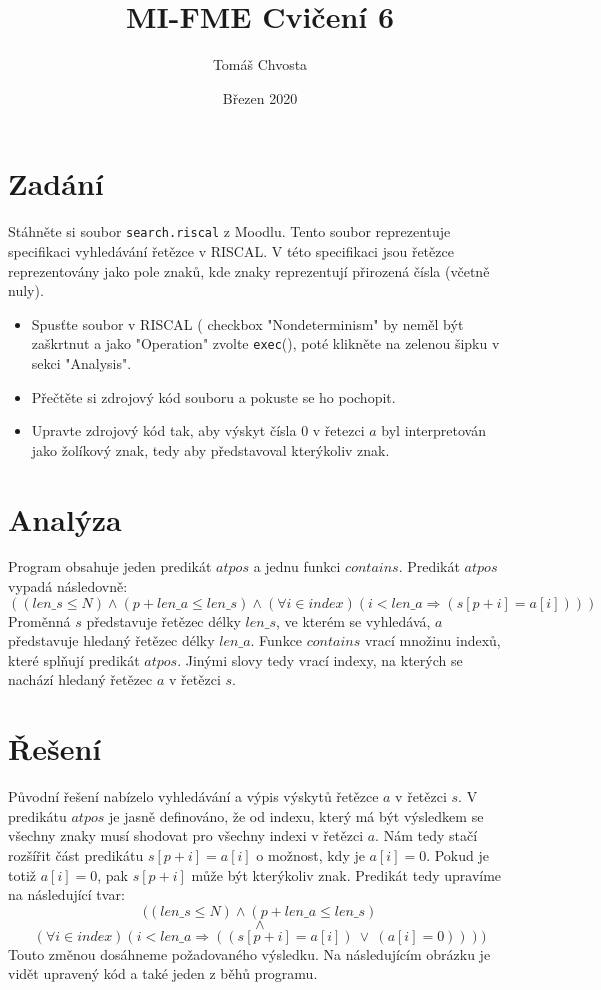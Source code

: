 \documentclass{article}
\title{MI-FME Cvičení 6}
\author{Tomáš Chvosta}
\date{Březen 2020}
\begin{document}
\maketitle

\section{Zadání}

Stáhněte si soubor \texttt{search.riscal} z Moodlu. Tento soubor reprezentuje specifikaci vyhledávání řetězce v RISCAL. V této specifikaci jsou řetězce reprezentovány jako pole znaků, kde znaky reprezentují přirozená čísla (včetně nuly).

\begin{itemize}
				
	\item Spusťte soubor v RISCAL ( checkbox "Nondeterminism" by neměl být zaškrtnut a jako "Operation" zvolte \texttt{exec}(), poté klikněte na zelenou šipku v sekci "Analysis".
	
	\item Přečtěte si zdrojový kód souboru a pokuste se ho pochopit.
	
	\item Upravte zdrojový kód tak, aby výskyt čísla $0$ v řetezci $a$ byl interpretován jako žolíkový znak, tedy aby představoval kterýkoliv znak.
					
\end{itemize}

\section{Analýza}

Program obsahuje jeden predikát $atpos$ a jednu funkci $contains$. Predikát $atpos$ vypadá následovně:
$$((len\_s \leq N) \wedge (p+len\_a \leq len\_s) \wedge (\forall i \in index)(i < len\_a \Rightarrow (s[p+i]=a[i])))$$
Proměnná $s$ představuje řetězec délky $len\_s$, ve kterém se vyhledává, $a$ představuje hledaný řetězec délky $len\_a$. Funkce $contains$ vrací množinu indexů, které splňují predikát $atpos$. Jinými slovy tedy vrací indexy, na kterých se nachází hledaný řetězec $a$ v řetězci $s$.

\section{Řešení}

Původní řešení nabízelo vyhledávání a výpis výskytů řetězce $a$ v řetězci $s$. V predikátu $atpos$ je jasně definováno, že od indexu, který má být výsledkem se všechny znaky musí shodovat pro všechny indexi v řetězci $a$. Nám tedy stačí rozšířit část predikátu $s[p+i]=a[i]$ o možnost, kdy je $a[i] = 0 $. Pokud je totiž $a[i] = 0$, pak $s[p+i]$ může být kterýkoliv znak. Predikát tedy upravíme na následující tvar:
$$((len\_s \leq N) \wedge (p+len\_a \leq len\_s)$$ $$\wedge$$ $$(\forall i \in index)(i < len\_a \Rightarrow ((s[p+i]=a[i]) \ \lor \ (a[i]=0))))$$
Touto změnou dosáhneme požadovaného výsledku. Na následujícím obrázku je vidět upravený kód a také jeden z běhů programu.
\end{document}
